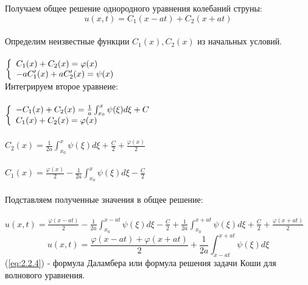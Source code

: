 \documentclass[../main.tex]{subfiles}
\begin{document}
Получаем общее решение однородного уравнения колебаний струны:\\
\[u(x,t)=C_1(x-at)+C_2(x+at)\]\\
Определим неизвестные функции $C_1(x), C_2(x)$ из начальных условий.\\\\
$
	\begin{left}
		\{
		\begin{array}{lcl}
			C_{1}(x)+C_2(x)=\varphi(x) \\
			-aC_1'(x)+aC_2'(x)=\psi(x) \\
		\end{array}
		\right.
	\end{left}
$
\\Интегрируем второе уравнеие:\\\\
$
	\begin{left}
		\{
		\begin{array}{lcl}
			-C_1(x)+C_2(x)=\frac{1}{a}\int_{x_0}^x\psi(\xi)d\xi+C \\
			C_1(x)+C_2(x)=\varphi(x)                              \\
		\end{array}
		\right.
	\end{left}
$
\\\\
$C_2(x)=\frac{1}{2a}\int_{x_0}^x\psi(\xi)d\xi+\frac{C}{2}+\frac{\varphi(x)}{2}$\\\\
$C_1(x)=\frac{\varphi(x)}{2}-\frac{1}{2a}\int_{x_0}^x\psi(\xi)d\xi-\frac{C}{2}$\\\\
Подставляем полученные значения в общее решение:\\\\
$u(x,t)=\frac{\varphi(x-at)}{2}-\frac{1}{2a}\int_{x_0}^{x-at}\psi(\xi)d\xi-\frac{C}{2}+\frac{1}{2a}\int_{x_0}^{x+at}\psi(\xi)d\xi+\frac{C}{2}+\frac{\varphi(x+at)}{2}$
\begin{equation}\label{eq:2.2.4}
	u(x,t)=\frac{\varphi(x-at)+\varphi(x+at)}{2}+\frac{1}{2a}\int_{x-at}^{x+at}\psi(\xi)d\xi
\end{equation}
(\ref{eq:2.2.4}) - формула Даламбера или формула решения задачи Коши для волнового уравнения.
\end{document}
